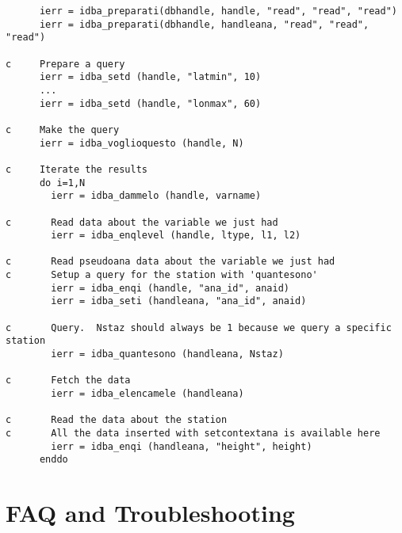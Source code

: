 \documentclass[final,12pt,a4paper,twoside]{book}
\begin{document}
\begin{verbatim}
      ierr = idba_preparati(dbhandle, handle, "read", "read", "read")
      ierr = idba_preparati(dbhandle, handleana, "read", "read", "read")
      
c     Prepare a query
      ierr = idba_setd (handle, "latmin", 10)
      ...
      ierr = idba_setd (handle, "lonmax", 60)

c     Make the query
      ierr = idba_voglioquesto (handle, N)

c     Iterate the results
      do i=1,N
        ierr = idba_dammelo (handle, varname)

c       Read data about the variable we just had
        ierr = idba_enqlevel (handle, ltype, l1, l2)

c       Read pseudoana data about the variable we just had
c       Setup a query for the station with 'quantesono'
        ierr = idba_enqi (handle, "ana_id", anaid)
        ierr = idba_seti (handleana, "ana_id", anaid)

c       Query.  Nstaz should always be 1 because we query a specific station
        ierr = idba_quantesono (handleana, Nstaz)

c       Fetch the data
        ierr = idba_elencamele (handleana)

c       Read the data about the station
c       All the data inserted with setcontextana is available here
        ierr = idba_enqi (handleana, "height", height)
      enddo
\end{verbatim}


\chapter{FAQ and Troubleshooting}
\label{ch-trouble}
\end{document}
